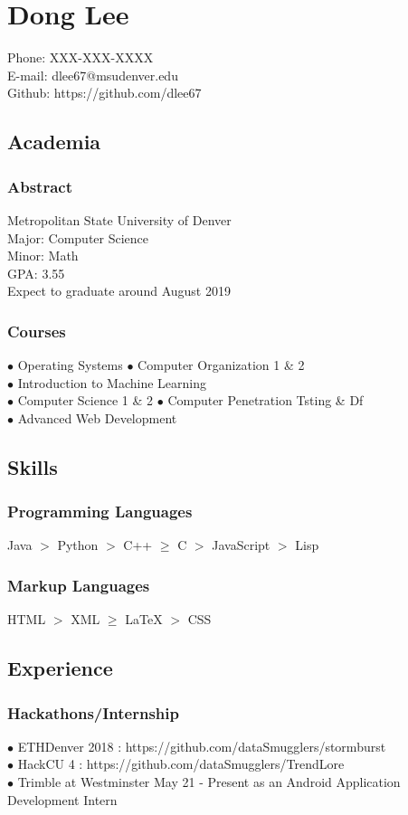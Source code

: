 \documentclass{article}
\begin{document}
\section{Dong Lee}
{\Large Phone: XXX-XXX-XXXX} \\
{\Large E-mail: dlee67@msudenver.edu} \\
{\Large Github: https://github.com/dlee67}
\subsection{Academia}
\subsubsection {Abstract}
{\Large Metropolitan State University of Denver} \\
{\Large Major: Computer Science} \\
{\Large Minor: Math} \\
{\Large GPA: 3.55} \\
{\Large Expect to graduate around August 2019}
\subsubsection {Courses}
$\bullet$ {\Large Operating Systems} $\bullet$ {\Large Computer Organization 1 \& 2} \\ $\bullet$ {\Large Introduction to Machine Learning} \\
$\bullet$ {\Large Computer Science 1 \& 2} $\bullet$ {\Large Computer Penetration Tsting \& Df} \\ $\bullet$ {\Large Advanced Web Development}
\subsection{Skills}
\subsubsection{Programming Languages}
{\Large Java $>$ Python $>$ C++ $\geq$ C $>$ JavaScript $>$ Lisp}
\subsubsection{Markup Languages}
{\Large HTML $>$ XML $\geq$ {\LaTeX} $>$ CSS}
\subsection{Experience}
\subsubsection{Hackathons/Internship}
{\Large
$\bullet$ ETHDenver 2018 : https://github.com/dataSmugglers/stormburst \\
$\bullet$ HackCU 4 : https://github.com/dataSmugglers/TrendLore \\
$\bullet$ Trimble at Westminster May 21 - Present as an Android Application Development Intern
}
\end{document}
